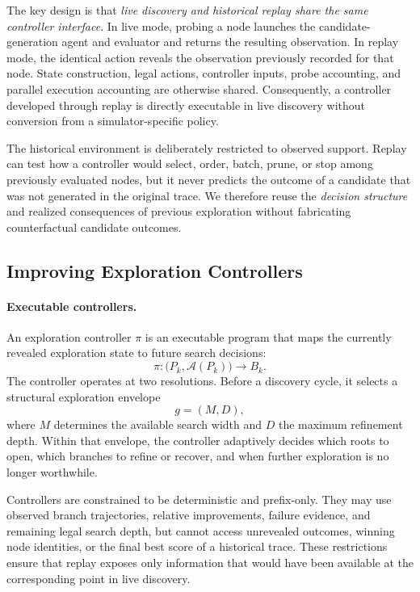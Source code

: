 The key design is that \emph{live discovery and historical replay share the
same controller interface}. In live mode, probing a node launches the
candidate-generation agent and evaluator and returns the resulting observation.
In replay mode, the identical action reveals the observation previously
recorded for that node. State construction, legal actions, controller inputs,
probe accounting, and parallel execution accounting are otherwise shared.
Consequently, a controller developed through replay is directly executable in
live discovery without conversion from a simulator-specific policy.

The historical environment is deliberately restricted to observed support.
Replay can test how a controller would select, order, batch, prune, or stop
among previously evaluated nodes, but it never predicts the outcome of a
candidate that was not generated in the original trace. We therefore reuse the
\emph{decision structure} and realized consequences of previous exploration
without fabricating counterfactual candidate outcomes.


\subsection{Improving Exploration Controllers}
\label{sec:controller-improvement}

\paragraph{Executable controllers.}
An exploration controller $\pi$ is an executable program that maps the
currently revealed exploration state to future search decisions:
\begin{equation}
    \pi:
    \bigl(P_k,\mathcal{A}(P_k)\bigr)
    \longrightarrow B_k .
\end{equation}
The controller operates at two resolutions. Before a discovery cycle, it
selects a structural exploration envelope
\begin{equation}
    g=(M,D),
\end{equation}
where $M$ determines the available search width and $D$ the maximum refinement
depth. Within that envelope, the controller adaptively decides which roots to
open, which branches to refine or recover, and when further exploration is no
longer worthwhile.

Controllers are constrained to be deterministic and prefix-only. They may use
observed branch trajectories, relative improvements, failure evidence, and
remaining legal search depth, but cannot access unrevealed outcomes, winning
node identities, or the final best score of a historical trace. These
restrictions ensure that replay exposes only information that would have been
available at the corresponding point in live discovery.

